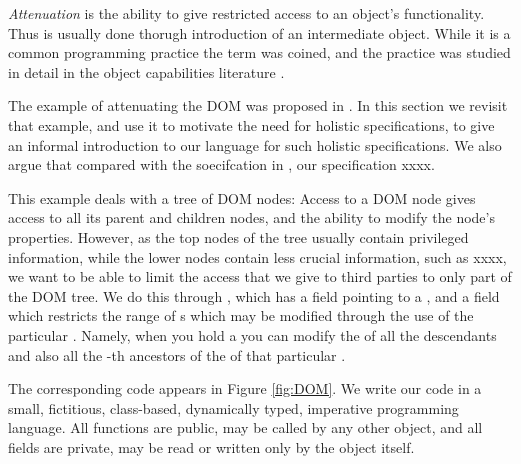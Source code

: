 \emph{Attenuation} is the ability to give restricted access to an object's functionality. Thus is usually done thorugh
introduction of an intermediate object. While it is a common programming practice the term was coined, and the practice 
was studied in detail in the object capabilities literature \cite{millerPhD}. 

The example of attenuating the DOM was proposed in \cite{dd}. 
In this section we revisit that example, and use it to motivate the need for holistic specifications, to give an informal introduction
to  our language for such holistic specifications. We also argue that compared with the soecifcation in \cite{dd}, our specification xxxx.

This example deals with a tree of DOM nodes: Access to a DOM node gives access to all its parent and children nodes, and the ability to modify the node's properties. However, as the top nodes of the tree usually contain privileged information, while the lower nodes contain less crucial information, such as xxxx, we want to be able to limit  the access that we give  to third parties to only part of the DOM tree. We do this through , which has a field  pointing to a , and a field  which restricts the range of s which may be modified through the use of the particular . Namely, when you hold a   you can modify the  of all the descendants    and also all the -th ancestors of the  of that particular .

The corresponding code appears in Figure \ref{fig:DOM}. 
We write our code in a small, fictitious, class-based, dynamically typed, imperative programming language. All functions are public, \ie may be called by any other object, and all fields are private, \ie may be read or written only by the object itself. 

